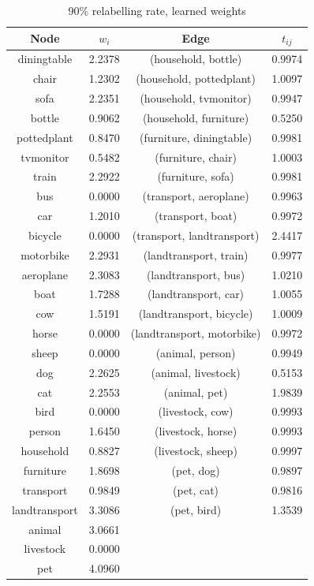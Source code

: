 \documentclass[11pt,a4paper]{article}
\begin{document}
\begin{table}[htbp]
\centering
\begin{tabular}{c|c|c|c}
Node & $w_i$ & Edge & $t_{ij}$\\\hline
diningtable   & 2.2378 & (household, bottle)        & 0.9974\\
chair         & 1.2302 & (household, pottedplant)   & 1.0097\\
sofa          & 2.2351 & (household, tvmonitor)     & 0.9947\\
bottle        & 0.9062 & (household, furniture)     & 0.5250\\
pottedplant   & 0.8470 & (furniture, diningtable)   & 0.9981\\
tvmonitor     & 0.5482 & (furniture, chair)         & 1.0003\\
train         & 2.2922 & (furniture, sofa)          & 0.9981\\
bus           & 0.0000 & (transport, aeroplane)     & 0.9963\\
car           & 1.2010 & (transport, boat)          & 0.9972\\
bicycle       & 0.0000 & (transport, landtransport) & 2.4417\\
motorbike     & 2.2931 & (landtransport, train)     & 0.9977\\
aeroplane     & 2.3083 & (landtransport, bus)       & 1.0210\\
boat          & 1.7288 & (landtransport, car)       & 1.0055\\
cow           & 1.5191 & (landtransport, bicycle)   & 1.0009\\
horse         & 0.0000 & (landtransport, motorbike) & 0.9972\\
sheep         & 0.0000 & (animal, person)           & 0.9949\\
dog           & 2.2625 & (animal, livestock)        & 0.5153\\
cat           & 2.2553 & (animal, pet)              & 1.9839\\
bird          & 0.0000 & (livestock, cow)           & 0.9993\\
person        & 1.6450 & (livestock, horse)         & 0.9993\\
household     & 0.8827 & (livestock, sheep)         & 0.9997\\
furniture     & 1.8698 & (pet, dog)                 & 0.9897\\
transport     & 0.9849 & (pet, cat)                 & 0.9816\\
landtransport & 3.3086 & (pet, bird)                & 1.3539\\
animal        & 3.0661 & &\\
livestock     & 0.0000 & &\\
pet           & 4.0960 & &
\end{tabular}
\caption{90\% relabelling rate, learned weights}
\label{tab:90weight}
\end{table}
\end{document}
